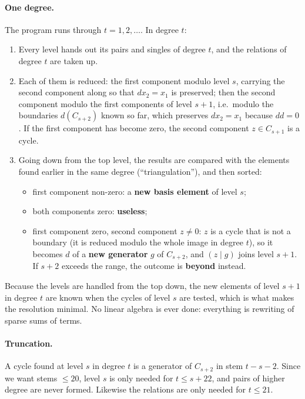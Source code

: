 \documentclass[11pt]{article}
\begin{document}
\paragraph{One degree.}
The program runs through $t = 1, 2, \dots$. In degree $t$:
\begin{enumerate}
\item Every level hands out its pairs and singles of degree $t$, and the relations of degree $t$
  are taken up.
\item Each of them is reduced: the first component modulo level $s$, carrying the second component
  along so that $d x_2 = x_1$ is preserved; then the second component modulo the first components
  of level $s+1$, i.e.\ modulo the boundaries $d(C_{s+2})$ known so far, which preserves
  $d x_2 = x_1$ because $dd = 0$. If the first component has become zero, the second component
  $z \in C_{s+1}$ is a cycle.
\item Going down from the top level, the results are compared with the elements found earlier in
  the same degree (``triangulation''), and then sorted:
  \begin{itemize}
  \item first component non-zero: a \textbf{new basis element} of level $s$;
  \item both components zero: \textbf{useless};
  \item first component zero, second component $z \ne 0$: $z$ is a cycle that is not a boundary
    (it is reduced modulo the whole image in degree $t$), so it becomes $d$ of a
    \textbf{new generator} $g$ of $C_{s+2}$, and $(z \mid g)$ joins level $s+1$. If $s + 2$
    exceeds the range, the outcome is \textbf{beyond} instead.
  \end{itemize}
\end{enumerate}
Because the levels are handled from the top down, the new elements of level $s+1$ in degree $t$
are known when the cycles of level $s$ are tested, which is what makes the resolution minimal.
No linear algebra is ever done: everything is rewriting of sparse sums of terms.

\paragraph{Truncation.}
A cycle found at level $s$ in degree $t$ is a generator of $C_{s+2}$ in stem $t-s-2$. Since we
want stems $\le 20$, level $s$ is only needed for $t \le s + 22$, and pairs of higher degree are
never formed. Likewise the relations are only needed for $t \le 21$.
\end{document}
